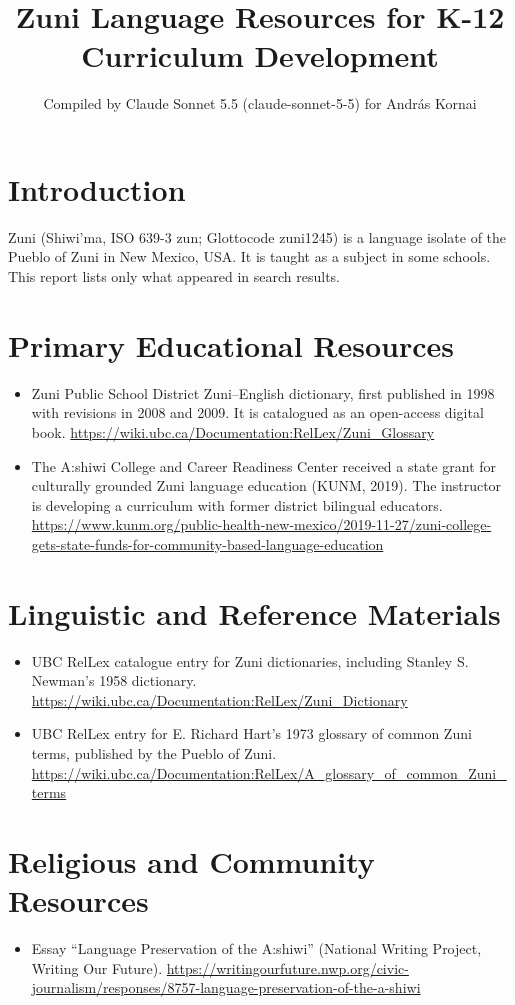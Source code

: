 \documentclass[12pt]{article}
\title{Zuni Language Resources for K-12 Curriculum Development}
\author{Compiled by Claude Sonnet 5.5 (claude-sonnet-5-5) for Andr\'as Kornai}
\date{}
\begin{document}
\maketitle

\section{Introduction}
Zuni (Shiwi'ma, ISO 639-3 zun; Glottocode zuni1245) is a language isolate of the Pueblo of Zuni in New Mexico, USA. It is taught as a subject in some schools. This report lists only what appeared in search results.

\section{Primary Educational Resources}
\begin{itemize}
\item Zuni Public School District Zuni--English dictionary, first published in 1998 with revisions in 2008 and 2009. It is catalogued as an open-access digital book. \url{https://wiki.ubc.ca/Documentation:RelLex/Zuni_Glossary}
\item The A:shiwi College and Career Readiness Center received a state grant for culturally grounded Zuni language education (KUNM, 2019). The instructor is developing a curriculum with former district bilingual educators. \url{https://www.kunm.org/public-health-new-mexico/2019-11-27/zuni-college-gets-state-funds-for-community-based-language-education}
\end{itemize}

\section{Linguistic and Reference Materials}
\begin{itemize}
\item UBC RelLex catalogue entry for Zuni dictionaries, including Stanley S. Newman's 1958 dictionary. \url{https://wiki.ubc.ca/Documentation:RelLex/Zuni_Dictionary}
\item UBC RelLex entry for E. Richard Hart's 1973 glossary of common Zuni terms, published by the Pueblo of Zuni. \url{https://wiki.ubc.ca/Documentation:RelLex/A_glossary_of_common_Zuni_terms}
\end{itemize}

\section{Religious and Community Resources}
\begin{itemize}
\item Essay ``Language Preservation of the A:shiwi'' (National Writing Project, Writing Our Future). \url{https://writingourfuture.nwp.org/civic-journalism/responses/8757-language-preservation-of-the-a-shiwi}
\end{itemize}
\end{document}
